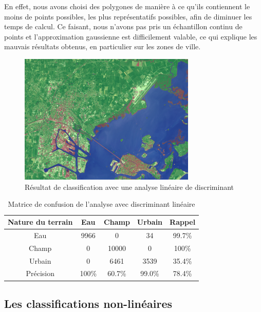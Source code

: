 \documentclass[a4paper,10pt]{article}
\begin{document}
  En effet, nous avons choisi des polygones de manière à ce qu'ils contiennent le moins de points possibles, les plus représentatifs possibles, afin de diminuer les temps de calcul. Ce faisant, nous n'avons pas pris un échantillon continu de points et l'approximation gaussienne est difficilement valable, ce qui explique les mauvais résultats obtenus, en particulier sur les zones de ville.
\begin{figure}[H]
  \centering
    \includegraphics[width=0.75\textwidth]{venise+LDA}
  \caption{Résultat de classification avec une analyse linéaire de discriminant}
  \label{fig:veniseLDA}
\end{figure}

\begin{table}[H]
\begin{center}
 \begin{tabular}{|c|c|c|c|c|}
  \hline
  Nature du terrain & Eau & Champ & Urbain & Rappel \\
  \hline
Eau & 9966  &   0  &      34 & 99.7\% \\
Champ & 0  &  10000   &     0 & 100\% \\
Urbain &  0    &    6461  &   3539   &     35.4\% \\
Précision & 100\% & 60.7\%  &      99.0\% & {\color{red}78.4\%}\\
  \hline
\end{tabular}
\end{center}
\caption{Matrice de confusion de l'analyse avec discriminant linéaire }
\label{table:veniseLDA}
\end{table}
    
     

\subsection{Les classifications non-linéaires}
\end{document}
